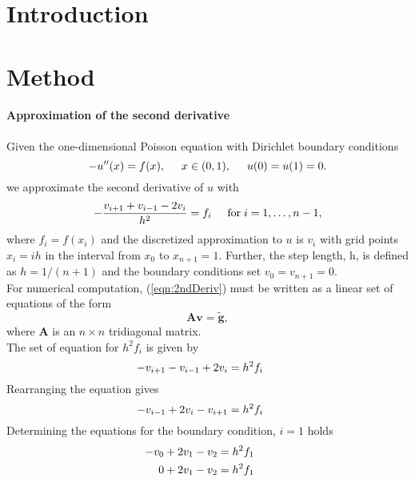 \documentclass[%
oneside,                 %
final,                   %
10pt]{article}
\begin{document}
\section{Introduction}
\section{Method}
\paragraph{Approximation of the second derivative}
Given the one-dimensional Poisson equation with Dirichlet boundary conditions
\begin{equation*}
-u''(x) = f(x), \hspace{0.5cm} x\in(0,1), \hspace{0.5cm} u(0) = u(1) = 0.
\end{equation*}
we approximate the second derivative of $u$ with
\begin{equation}\label{eqn:2ndDeriv}
   -\frac{v_{i+1}+v_{i-1}-2v_i}{h^2} = f_i  \hspace{0.5cm} \mathrm{for} \hspace{0.1cm} i=1,\dots, n-1,
\end{equation}
where $f_i=f(x_i)$ and the discretized approximation to $u$ is $v_i$ with grid points $x_i = ih$ in the interval from $x_0$ to $x_{n+1}=1$.
Further, the step length, h,  is defined as $h=1/(n+1)$ and the boundary conditions set $v_0 = v_{n+1}=0$. \\
For numerical computation, (\ref{eqn:2ndDeriv}) must be written as a linear set of equations of the form
\begin{equation*}
   \mathbf{A}\mathbf{v} = \tilde{\mathbf{g}},
\end{equation*}
where $\mathbf{A}$ is an $n\times n$  tridiagonal matrix.\\
The set of equation for $h^2f_i$ is given by
\begin{equation*}
   -v_{i+1}-v_{i-1}+2v_i = h^2f_i  \hspace{0.5cm} 
\end{equation*}
Rearranging the equation gives
\begin{equation*}
  -v_{i-1}+2v_i - v_{i+1}= h^2f_i  \hspace{0.5cm} 
\end{equation*}
Determining the equations for the boundary condition, $i=1$ holds 
\begin{equation*}
\begin{aligned}
  -v_{0}+2v_1 - v_{2}&= h^2f_1  \hspace{0.5cm} \\
  0 + 2v_1 - v_{2}&= h^2f_1  \hspace{0.5cm} 
\end{aligned}
\end{equation*}
\end{document}
